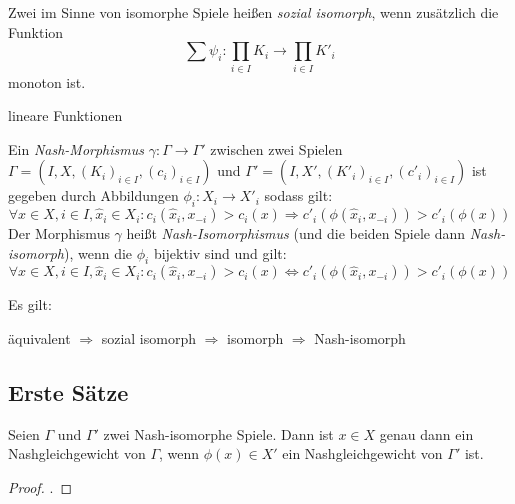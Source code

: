 \begin{defn}
	Zwei im Sinne von  isomorphe Spiele heißen \emph{sozial isomorph}, wenn zusätzlich die Funktion
		\[\sum \psi_i: \prod_{i \in I}K_i \to \prod_{i \in I} K'_i \]
	monoton ist. 
\end{defn}

\begin{bsp}
	lineare Funktionen
\end{bsp}	

\begin{defn}\label{def:NashMorphismus}
	Ein \emph{Nash-Morphismus} $\gamma: \Gamma \to \Gamma'$ zwischen zwei Spielen $\Gamma = (I, X, (K_i)_{i\in I}, (c_i)_{i\in I})$ und $\Gamma' = (I, X', (K'_i)_{i\in I}, (c'_i)_{i\in I})$ ist gegeben durch Abbildungen $\phi_i: X_i \to X'_i$ sodass gilt:
		\[\forall x\in X, i \in I, \hat{x}_i \in X_i: c_i(\hat{x}_i,x_{-i}) > c_i(x) \Rightarrow c'_i(\phi(\hat{x}_i,x_{-i})) > c'_i(\phi(x))\]
	Der Morphismus $\gamma$ heißt \emph{Nash-Isomorphismus} (und die beiden Spiele dann \emph{Nash-isomorph}), wenn die $\phi_i$ bijektiv sind und gilt:
		\[\forall x\in X, i \in I, \hat{x}_i \in X_i: c_i(\hat{x}_i,x_{-i}) > c_i(x) \iff c'_i(\phi(\hat{x}_i,x_{-i})) > c'_i(\phi(x))\]
\end{defn}

\begin{beob}
	Es gilt:
	\begin{center}
		äquivalent $\Rightarrow$ sozial isomorph $\Rightarrow$ isomorph $\Rightarrow$ Nash-isomorph
	\end{center}
\end{beob}


\subsection{Erste Sätze}

\begin{lemma}
	Seien $\Gamma$ und $\Gamma'$ zwei Nash-isomorphe Spiele. Dann ist $x \in X$ genau dann ein Nashgleichgewicht von $\Gamma$, wenn $\phi(x) \in X'$ ein Nashgleichgewicht von $\Gamma'$ ist.
\end{lemma}

\begin{proof}.
	
\end{proof}

